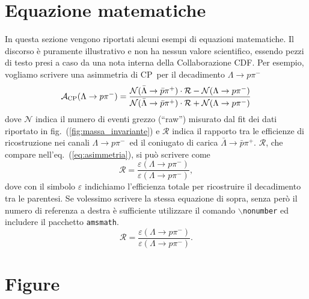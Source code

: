 \documentclass[a4paper,10pt]{article}
\newcommand{\CP}{{\rm CP}}
\newcommand{\proton}{\ensuremath{p}}
\newcommand{\antiproton}{\ensuremath{\bar{p}}}
\newcommand{\acp}{\ensuremath{{\cal A}_{\CP}}}
\newcommand{\lambdazero}{\ensuremath{\Lambda}}
\newcommand{\lambdazeroppi}{\ensuremath{\lambdazero \to \proton\pi^-}}
\newcommand{\alambdazeroppi}{\ensuremath{\bar{\lambdazero} \to \antiproton \pi^+}}
\begin{document}
\section{Equazione matematiche}
\label{sec:equazioni} 

In questa sezione vengono riportati alcuni esempi di equazioni matematiche. 
Il discorso \`e puramente illustrativo e non ha nessun valore 
scientifico, essendo pezzi di testo presi a caso da una nota interna della Collaborazione CDF.
Per esempio,  vogliamo scrivere una asimmetria di \CP\ per il decadimento \lambdazeroppi\
\begin{equation}
\acp(\lambdazeroppi) = \frac{\mathcal{N}(\alambdazeroppi) \cdot \mathcal{R}  -  \mathcal{N}(\lambdazeroppi)} 
{\mathcal{N}(\alambdazeroppi) \cdot \mathcal{R}   +  \mathcal{N}(\lambdazeroppi) }
\label{eq:asimmetria}
\end{equation}
dove  $\mathcal{N}$ indica il numero di eventi grezzo (``raw'') misurato dal fit dei dati riportato in fig.~(\ref{fig:massa_invariante})
e $\mathcal{R}$ indica  il rapporto tra le efficienze di ricostruzione nei canali \lambdazeroppi\ ed il coniugato di carica 
\alambdazeroppi. $\mathcal{R}$, che compare nell'eq.~(\ref{eq:asimmetria}), si pu\`o scrivere come
\begin{equation}
\mathcal{R} = \frac{\varepsilon(\lambdazeroppi)}{\varepsilon(\lambdazeroppi)}, 
\label{eq:rapporto_efficienze}  
\end{equation}
dove con il simbolo $\varepsilon$ indichiamo l'efficienza totale per ricostruire il decadimento tra le parentesi.
Se volessimo scrivere la stessa equazione di sopra, senza per\`o il numero di referenza a destra \`e sufficiente utilizzare 
il comando {\tt  $\backslash$nonumber} ed includere il pacchetto  \texttt{amsmath}.
\begin{equation}
\mathcal{R} = \frac{\varepsilon(\lambdazeroppi)}{\varepsilon(\lambdazeroppi)}.\nonumber
\label{eq:rapporto_efficienze2}  
\end{equation}



\section{Figure}
\label{sec:figure}
\end{document}
